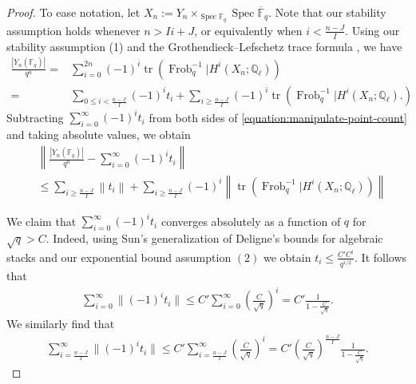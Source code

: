 \documentclass[12 pt]{amsart}
\theoremstyle{plain}
\theoremstyle{definition}
\theoremstyle{remark}
\numberwithin{equation}{section}
\DeclareMathOperator\spec{Spec}
\DeclareMathOperator\tr{tr}
\DeclareMathOperator\frob{Frob}
\begin{document}
\begin{proof}
	To ease notation, let $X_n := Y_n \times_{\spec \mathbb F_q} \spec \overline {\mathbb
		F}_q$.
	Note that our stability assumption holds whenever $n > I i + J$, or
	equivalently when $i < \frac{n - J}{I}$.
	Using our stability assumption (1)
	and the Grothendieck--Lefschetz trace formula
	\cite[Theorem 3.1.2]{behrend:lefschetz-trace-formula},
	we have
	\begin{equation}
		\label{equation:manipulate-point-count}
		\begin{aligned}
			\frac{\left|Y_n (\mathbb F_q)\right|}{q^n} =& \sum_{i=0}^{2n}
			(-1)^i \tr \left(
			\frob_q^{-1} | H^i(X_n; \mathbb Q_{\ell}) \right)
			\\
			=& \sum_{0 \leq i < \frac{n-J}{I}}
			(-1)^i t_i 
			+\sum_{i \geq \frac{n-J}{I}} (-1)^i\tr \left(
				\frob_q^{-1} | H^i(X_n; \mathbb Q_{\ell}).
			\right)
		\end{aligned}
	\end{equation}
	Subtracting $\sum_{i=0}^\infty (-1)^i t_i$ 
	from both
	sides of \eqref{equation:manipulate-point-count} and taking absolute
	values, we obtain
	\begin{equation}
		\label{equation:difference-bound}
		\begin{aligned}
			&\left \|\frac{\left|Y_n (\mathbb F_q)\right|}{q^n} - \sum_{i=0}^\infty
			(-1)^i t_i 
			\right\| \\
			&\leq \sum_{i \geq \frac{n-J}{I}} \left\| t_i 
			\right\| + 
\sum_{i \geq \frac{n-J}{I}} (-1)^i \left \| \tr \left(
				\frob_q^{-1} | H^i(X_n; \mathbb Q_{\ell})
			\right) \right \|
		\end{aligned}
	\end{equation}
	
	We claim that $\sum_{i=0}^\infty (-1)^i t_i $
	converges absolutely as a
	function of $q$ for $\sqrt{q} > C$.
	Indeed, using Sun's generalization of Deligne's bounds for algebraic stacks
	\cite[Theorem 1.4]{sun:l-series-of-artin-stacks} and our exponential
	bound assumption $(2)$ we
	obtain 
	$t_i \leq \frac{C'C^{i}}{q^{i/2}}$.
	It follows that 
	\begin{align*}
		\sum_{i=0}^\infty \| (-1)^i t_i
		\| \leq C'
		\sum_{i=0}^\infty \left (\frac{C}{\sqrt{q}} \right)^i = C'
		\frac{1}{1-\frac{C}{\sqrt q}}.
	\end{align*}
	We similarly find that  
	\begin{align}
		\label{equation:trace-bound}
		\sum_{i= \frac{n-J}{I}}^\infty \| (-1)^i t_i
		\| \leq C'\sum_{i= \frac{n-J}{I}}^\infty
		\left(\frac{C}{\sqrt q} \right)^i = C' \left(\frac{C}{\sqrt
			q}\right)^{\frac{n-J}{I}} \frac{1}{1-\frac{C}{\sqrt q}}.
	\end{align}
	

\end{proof}
\end{document}
